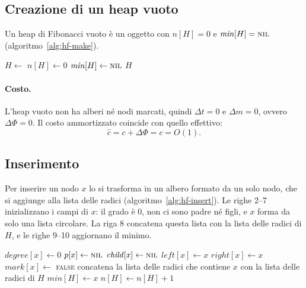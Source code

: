 \subsection{Creazione di un heap vuoto}\label{sec:hf-make}
Un heap di Fibonacci vuoto è un oggetto con $n[H] = 0$ e $\mathit{min}[H] = \textsc{nil}$ (algoritmo~\ref{alg:hf-make}).

\begin{algorithm}[htbp]
\caption{La creazione di un heap di Fibonacci vuoto.}\label{alg:hf-make}
\begin{algorithmic}[1]
  \State $H \gets$ 
  \State $n[H] \gets 0$
  \State $\mathit{min}[H] \gets \textsc{nil}$
  \State \Return $H$
\EndProcedure
\end{algorithmic}
\end{algorithm}

\paragraph{Costo.}
L'heap vuoto non ha alberi né nodi marcati, quindi $\Delta t = 0$ e $\Delta m = 0$, ovvero $\Delta\Phi = 0$. Il costo ammortizzato coincide con quello effettivo:
\[
\hat{c} = c + \Delta\Phi = c = O(1).
\]

\subsection{Inserimento}\label{sec:hf-insert}
Per inserire un nodo $x$ lo si trasforma in un albero formato da un solo nodo, che si aggiunge alla lista delle radici (algoritmo~\ref{alg:hf-insert}). Le righe 2--7 inizializzano i campi di $x$: il grado è $0$, non ci sono padre né figli, e $x$ forma da solo una lista circolare. La riga 8 concatena questa lista con la lista delle radici di $H$, e le righe 9--10 aggiornano il minimo.

\begin{algorithm}[htbp]
\caption{L'inserimento del nodo $x$, che diventa un nuovo albero nella lista delle radici.}\label{alg:hf-insert}
\begin{algorithmic}[1]
  \State $\mathit{degree}[x] \gets 0$
  \State $p[x] \gets \textsc{nil}$
  \State $\mathit{child}[x] \gets \textsc{nil}$
  \State $\mathit{left}[x] \gets x$
  \State $\mathit{right}[x] \gets x$
  \State $\mathit{mark}[x] \gets$ \textsc{false}
  \State concatena la lista delle radici che contiene $x$ con la lista delle radici di $H$
    \State $\mathit{min}[H] \gets x$
  \EndIf
  \State $n[H] \gets n[H] + 1$
\EndProcedure
\end{algorithmic}
\end{algorithm}

